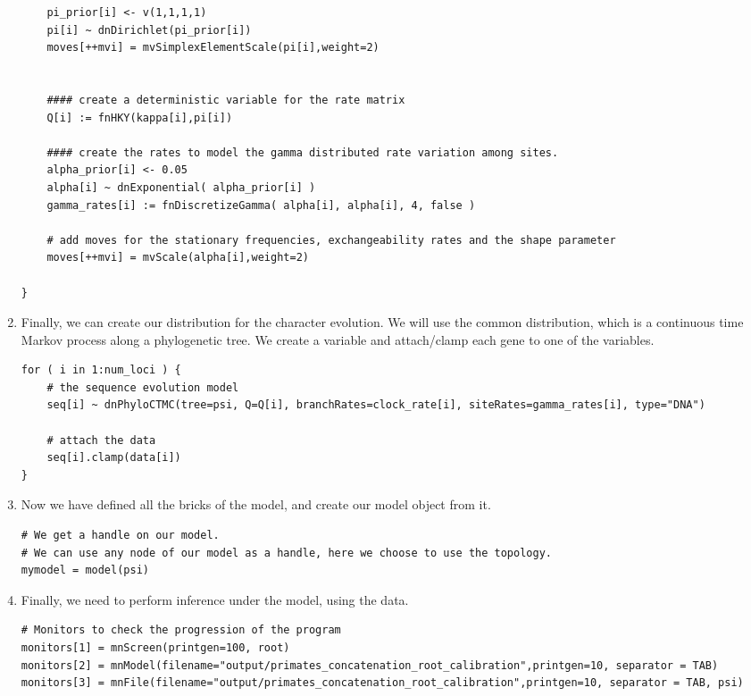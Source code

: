 \begin{enumerate}
{\begin{snugshade*}
\begin{lstlisting}
    pi_prior[i] <- v(1,1,1,1) 
    pi[i] ~ dnDirichlet(pi_prior[i])
    moves[++mvi] = mvSimplexElementScale(pi[i],weight=2)


    #### create a deterministic variable for the rate matrix
    Q[i] := fnHKY(kappa[i],pi[i]) 

    #### create the rates to model the gamma distributed rate variation among sites.
    alpha_prior[i] <- 0.05
    alpha[i] ~ dnExponential( alpha_prior[i] )
    gamma_rates[i] := fnDiscretizeGamma( alpha[i], alpha[i], 4, false )

    # add moves for the stationary frequencies, exchangeability rates and the shape parameter
    moves[++mvi] = mvScale(alpha[i],weight=2)

}

\end{lstlisting}
\end{snugshade*}}


\item Finally, we can create our distribution for the character evolution.
We will use the common  distribution, which is a continuous time Markov process along a phylogenetic tree.
We create a  variable and attach/clamp each gene to one of the  variables.
{\tt \begin{snugshade*}
\begin{lstlisting}
for ( i in 1:num_loci ) { 
    # the sequence evolution model
    seq[i] ~ dnPhyloCTMC(tree=psi, Q=Q[i], branchRates=clock_rate[i], siteRates=gamma_rates[i], type="DNA")

    # attach the data
    seq[i].clamp(data[i])
}
\end{lstlisting}
\end{snugshade*}}


\item Now we have defined all the bricks of the model, and create our model object from it.
{\tt \begin{snugshade*}
\begin{lstlisting}
# We get a handle on our model.
# We can use any node of our model as a handle, here we choose to use the topology.
mymodel = model(psi)
\end{lstlisting}
\end{snugshade*}}


\item Finally, we need to perform inference under the model, using the data.
{\tt \begin{snugshade*}
\begin{lstlisting}
# Monitors to check the progression of the program
monitors[1] = mnScreen(printgen=100, root)
monitors[2] = mnModel(filename="output/primates_concatenation_root_calibration",printgen=10, separator = TAB)
monitors[3] = mnFile(filename="output/primates_concatenation_root_calibration",printgen=10, separator = TAB, psi)


\end{lstlisting}
\end{snugshade*}}
\end{enumerate}
